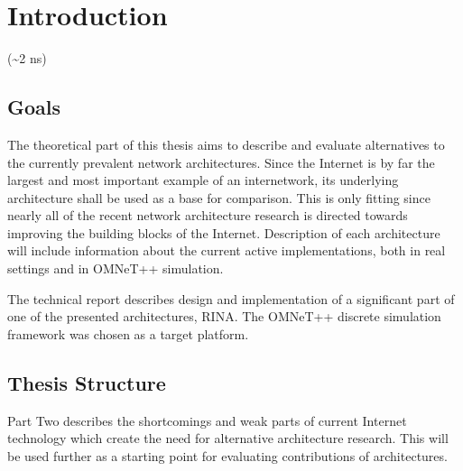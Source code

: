 

\chapter{Introduction}
    (\textasciitilde2 ns)



    \section{Goals}
        The theoretical part of this thesis aims to describe and evaluate alternatives to the currently prevalent network architectures. Since the Internet is by far the largest and most important example of an internetwork, its underlying architecture shall be used as a base for comparison. This is only fitting since nearly all of the recent network architecture research is directed towards improving the building blocks of the Internet. Description of each architecture will include information about the current active implementations, both in real settings and in OMNeT++ simulation.

        The technical report describes design and implementation of a significant part of one of the presented architectures, RINA. The OMNeT++ discrete simulation framework was chosen as a target platform.

    \section{Thesis Structure}

        Part Two describes the shortcomings and weak parts of current Internet technology which create the need for alternative architecture research. This will be used further as a starting point for evaluating contributions of architectures.

